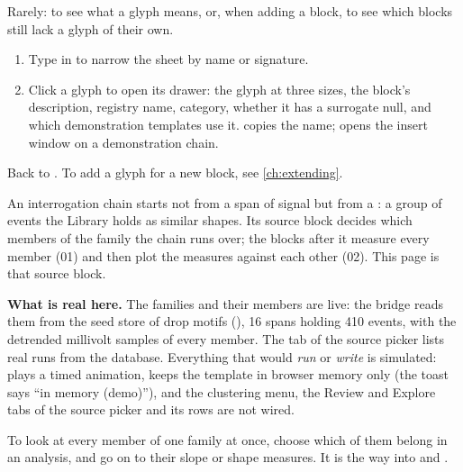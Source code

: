 Rarely: to see what a glyph means, or, when adding a block, to see which blocks still lack a glyph
of their own.


\begin{enumerate}
  \item Type in  to narrow the sheet by name or signature.
  \item Click a glyph to open its drawer: the glyph at three sizes, the block's description,
        registry name, category, whether it has a surrogate null, and which demonstration
        templates use it.  copies the name; 
        opens the insert window on a demonstration chain.
\end{enumerate}

Back to . To add a glyph for a new block, see \cref{ch:extending}.

An interrogation chain starts not from a span of signal but from a : a group
of events the Library holds as similar shapes. Its source block decides which members of the
family the chain runs over; the blocks after it measure every member (01) and then plot the
measures against each other (02). This page is that source block.

\textbf{What is real here.} The families and their members are live: the bridge reads them from
the seed store of drop motifs (), 16 spans holding 410 events, with the
detrended millivolt samples of every member. The  tab of the source picker lists
real runs from the database. Everything that would \emph{run} or \emph{write} is simulated:
 plays a timed animation,  keeps the template in browser memory
only (the toast says ``in memory (demo)''), and the clustering menu, the Review and Explore tabs of
the source picker and its  rows are not wired.

To look at every member of one family at once, choose which of them belong in an analysis, and go
on to their slope or shape measures. It is the way into  and
.

